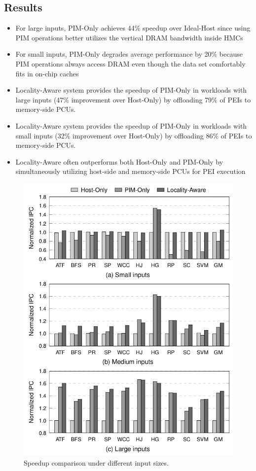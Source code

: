 \documentclass[a4paper,12pt, final]{report}
\begin{document}
\subsection{Results}
\begin{itemize}
  \setlength\itemsep{0em}
  \item For large inputs, PIM-Only achieves 44\% speedup over Ideal-Host since using PIM 
    operations better utilizes the vertical DRAM bandwidth inside HMCs
  \item For small inputs, PIM-Only degrades average performance by 20\% because PIM 
    operations always access DRAM even though the data set comfortably fits in on-chip 
    caches
  \item Locality-Aware system provides the speedup of PIM-Only in workloads with large
inputs (47\% improvement over Host-Only) by offloading 79\% of PEIs to memory-side PCUs.
  \item Locality-Aware system provides the speedup of PIM-Only in workloads
    with small inputs (32\% improvement over Host-Only) by offloading 86\% of PEIs to 
    memory-side PCUs.
  \item Locality-Aware often outperforms both Host-Only and PIM-Only by simultaneously 
    utilizing host-side and memory-side PCUs for PEI execution
\end{itemize}
\begin{figure}[h]
  \centering
  \includegraphics[width=0.7\linewidth]{results.png}
  \caption{Speedup comparison under different input sizes.}
\end{figure}
\end{document}
